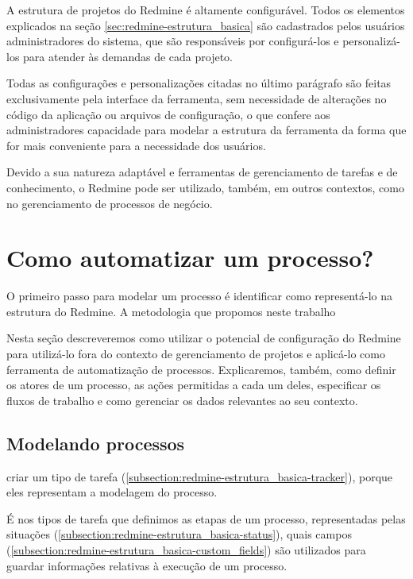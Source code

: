 A estrutura de projetos do Redmine é altamente configurável. Todos os elementos explicados na seção \ref{sec:redmine-estrutura_basica} são cadastrados pelos usuários administradores do sistema, que são responsáveis por configurá-los e personalizá-los para atender às demandas de cada projeto.

Todas as configurações e personalizações citadas no último parágrafo são feitas exclusivamente pela interface da ferramenta, sem necessidade de alterações no código da aplicação ou arquivos de configuração, o que confere aos administradores capacidade para modelar a estrutura da ferramenta da forma que for mais conveniente para a necessidade dos usuários.

Devido a sua natureza adaptável e ferramentas de gerenciamento de tarefas e de conhecimento, o Redmine pode ser utilizado, também, em outros contextos, como no gerenciamento de processos de negócio.


\section{Como automatizar um processo?}\label{sec:redmine-automatizar_processo}

O primeiro passo para modelar um processo é identificar como representá-lo na estrutura do Redmine. A metodologia que propomos neste trabalho 

Nesta seção descreveremos como utilizar o potencial de configuração do Redmine para utilizá-lo fora do contexto de gerenciamento de projetos e aplicá-lo como ferramenta de automatização de processos. Explicaremos, também, como definir os atores de um processo, as ações permitidas a cada um deles, especificar os fluxos de trabalho e como gerenciar os dados relevantes ao seu contexto.


\subsection{Modelando processos}\label{subsection:redmine-automatizar_processo-criacao}

criar um tipo de tarefa (\ref{subsection:redmine-estrutura_basica-tracker}), porque eles representam a modelagem do processo.

É nos tipos de tarefa que definimos as etapas de um processo, representadas pelas situações (\ref{subsection:redmine-estrutura_basica-status}), quais campos (\ref{subsection:redmine-estrutura_basica-custom_fields}) são utilizados para guardar informações relativas à execução de um processo.

